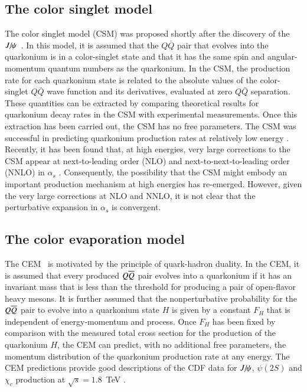 \subsection{The color singlet model}


The color singlet model (CSM) was proposed shortly after the discovery of the 
$J\hspace{-.08em}/\hspace{-.14em}\psi$~\cite{Einhorn:1975ua,Berger:1980ni,Ellis:1976fj,Carlson:1976cd}.
In this model, it is assumed that the $Q\bar Q$ pair that evolves into
the quarkonium is in a color-singlet state and that it has the same spin
and angular-momentum quantum numbers as the quarkonium. In the CSM, the
production rate for each quarkonium state is related to the absolute
values of the color-singlet $Q\bar Q$ wave function and its derivatives,
evaluated at zero $Q\bar Q$ separation. These quantities can be
extracted by comparing theoretical results for quarkonium decay
rates in the CSM with experimental measurements. Once this extraction
has been carried out, the CSM has no free parameters. The CSM was
successful in predicting quarkonium production rates at relatively low
energy \cite{Schuler:1994hy}. Recently, it has been found that, at high
energies, very large corrections to the CSM appear at next-to-leading
order (NLO) and next-to-next-to-leading order (NNLO) in $\alpha_s$
\cite{Artoisenet:2007xi,Campbell:2007ws,Artoisenet:2008fc}.
Consequently, the possibility that the CSM might embody an important 
production mechanism at high energies has re-emerged. 
However, given the very large corrections at
NLO and NNLO, it is not clear that the perturbative expansion in
$\alpha_s$ is convergent. 

\subsection{The color evaporation model}  
\label{prod_sec:CEM}

The CEM~\cite{Fritzsch:1977ay,Amundson:1995em,Amundson:1996qr}
is motivated by the principle of quark-hadron duality. In the CEM, it
is assumed that every produced $Q \overline{Q}$ pair evolves into a quarkonium
if it has an invariant mass that is less than the threshold for
producing a pair of open-flavor heavy mesons. It is further assumed that
the nonperturbative probability for the $Q \overline{Q}$ pair to evolve into a
quarkonium state $H$ is given by a constant $F_H$ that is independent of 
energy-momentum and process. Once $F_H$ has been fixed by
comparison with the measured total cross section for the production of
the quarkonium $H$, the CEM can predict, with no additional free
parameters, the momentum distribution of the quarkonium production rate
at any energy.
The CEM predictions provide good descriptions of the CDF data for $J\hspace{-.08em}/\hspace{-.14em}\psi$,
$\psi(2S)$ and $\chi_{c}$ production at $\sqrt{s}=1.8$~TeV
\cite{Amundson:1996qr}. 


